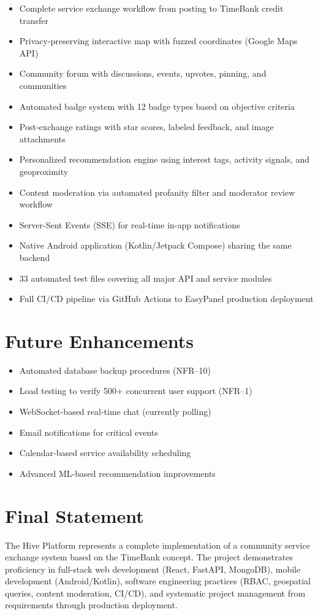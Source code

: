 \documentclass[10pt,a4paper]{report}
\begin{document}
\begin{itemize}
    \item Complete service exchange workflow from posting to TimeBank credit transfer
    \item Privacy-preserving interactive map with fuzzed coordinates (Google Maps API)
    \item Community forum with discussions, events, upvotes, pinning, and communities
    \item Automated badge system with 12 badge types based on objective criteria
    \item Post-exchange ratings with star scores, labeled feedback, and image attachments
    \item Personalized recommendation engine using interest tags, activity signals, and geoproximity
    \item Content moderation via automated profanity filter and moderator review workflow
    \item Server-Sent Events (SSE) for real-time in-app notifications
    \item Native Android application (Kotlin/Jetpack Compose) sharing the same backend
    \item 33 automated test files covering all major API and service modules
    \item Full CI/CD pipeline via GitHub Actions to EasyPanel production deployment
\end{itemize}

\section{Future Enhancements}

\begin{itemize}
    \item Automated database backup procedures (NFR--10)
    \item Load testing to verify 500+ concurrent user support (NFR--1)
    \item WebSocket-based real-time chat (currently polling)
    \item Email notifications for critical events
    \item Calendar-based service availability scheduling
    \item Advanced ML-based recommendation improvements
\end{itemize}

\section{Final Statement}

The Hive Platform represents a complete implementation of a community service exchange system based on the TimeBank concept. The project demonstrates proficiency in full-stack web development (React, FastAPI, MongoDB), mobile development (Android/Kotlin), software engineering practices (RBAC, geospatial queries, content moderation, CI/CD), and systematic project management from requirements through production deployment.
\end{document}
